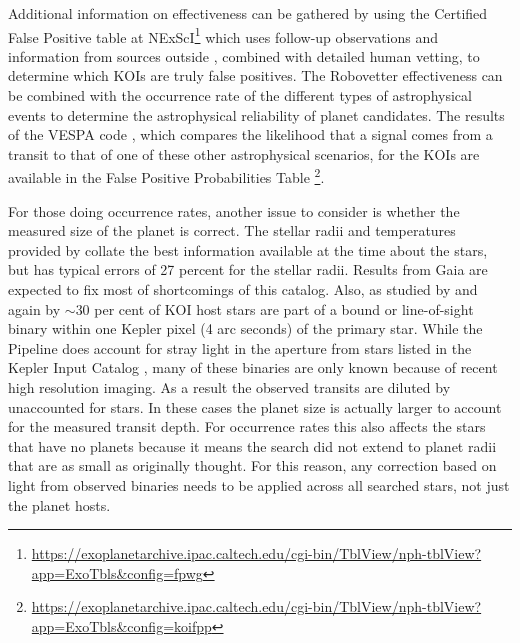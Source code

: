 Additional information on effectiveness can be gathered by using the Certified False Positive table at NExScI\footnote{\url{https://exoplanetarchive.ipac.caltech.edu/cgi-bin/TblView/nph-tblView?app=ExoTbls\&config=fpwg}} which uses follow-up observations and information from sources outside \kepler{}, combined with detailed human vetting, to determine which KOIs are truly false positives. The Robovetter effectiveness can be combined with the occurrence rate of the different types of astrophysical events to determine the astrophysical reliability of planet candidates. The results of the VESPA code \citep[][]{Morton2016}, which compares the likelihood that a signal comes from a transit to that of one of these other astrophysical scenarios, for the KOIs are available in the False Positive Probabilities Table \footnote{\url{https://exoplanetarchive.ipac.caltech.edu/cgi-bin/TblView/nph-tblView?app=ExoTbls\&config=koifpp}}.

For those doing occurrence rates, another issue to consider is whether the measured size of the planet is correct. The stellar radii and temperatures provided by \citet{Mathur2017ApJS} collate the best information available at the time about the \Kepler{} stars, but has typical errors of 27 percent for the stellar radii. Results from Gaia \citep{Gaia2016} are expected to fix most of shortcomings of this catalog. Also, as studied by \citep{Ciardi2015} and again by \citep{Furlan2017} $\sim$30 per cent of KOI host stars are part of a bound or line-of-sight binary within one Kepler pixel (4 arc seconds) of the primary star. While the \Kepler{} Pipeline does account for stray light in the aperture from stars listed in the Kepler Input Catalog \citep{Brown2011}, many of these binaries are only known because of recent high resolution imaging. As a result the observed transits are diluted by unaccounted for stars. In these cases the planet size is actually larger to account for the measured transit depth. For occurrence rates this also affects the stars that have no planets because it means the search did not extend to planet radii that are as small as originally thought.  For this reason, any correction based on light from observed binaries needs to be applied across all searched stars, not just the planet hosts.



